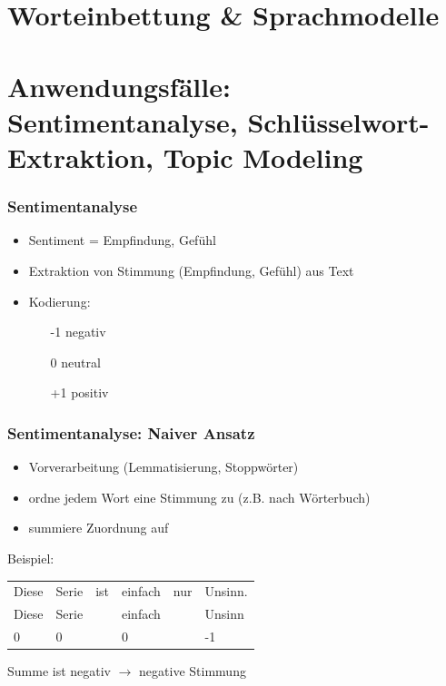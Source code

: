     
 
    
\section{Worteinbettung \& Sprachmodelle}

\section{Anwendungsfälle: Sentimentanalyse, Schlüsselwort-Extraktion, Topic Modeling}


\begin{frame}
\frametitle{Sentimentanalyse}

\begin{itemize}
	\item Sentiment = Empfindung, Gefühl
	\item Extraktion von Stimmung (Empfindung, Gefühl) aus Text
	\item Kodierung: \begin{itemize}
		\item[-1] negativ
		\item[0] neutral
		\item[+1] positiv
	\end{itemize}
\end{itemize}

\end{frame}


\begin{frame}
\frametitle{Sentimentanalyse: Naiver Ansatz}

\begin{itemize}
	\item Vorverarbeitung (Lemmatisierung, Stoppwörter)
	\item ordne jedem Wort eine Stimmung zu (z.B. nach Wörterbuch)
	\item summiere Zuordnung auf
\end{itemize}

\vspace{\baselineskip}

Beispiel:

\begin{tabular}{llllll}
Diese & Serie & ist & einfach & nur & Unsinn. \\
Diese & Serie &     & einfach &     & Unsinn  \\
0     & 0     &     & 0       &     & -1
\end{tabular}

\vspace{\baselineskip}

Summe ist negativ $\rightarrow$ negative Stimmung
\end{frame}

